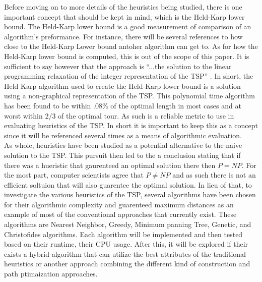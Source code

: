 \documentclass[midd]{thesis}
\newcommand{\tab}{\hspace*{2em}}
\begin{document}
\tab Before moving on to more details of the heuristics being studied, there is one important concept that should be kept in mind, which is the Held-Karp lower bound. The Held-Karp lower bound is a good measurement of comparison of an algorithm's preformance. For instance, there will be several references to how close to the Held-Karp Lower bound antoher algorithm can get to. As for how the Held-Karp lower bound is computed, this is out of the scope of this paper. It is sufficient to say however that the approach is ``...the solution to the linear programming relaxation of the integer representation of the TSP'' \cite{htspc}. In short, the Held Karp algorithm used to create the Held-Karp lower bound is a solution using a non-graphical representation of the TSP. This polynomial time algorithm has been found to be within .08\% of  the optimal length in most cases and at worst within $2/3$ of the optimal tour. As such is a reliable metric to use in evaluating heuristics of the TSP. In short it is important to keep this as a concept since it will be referenced several times as a means of algorithmic evaluation.\\
\tab As whole, heuristics have been studied as a potential alternative to the naive solution to the TSP. This pursuit then led to the a conclusion stating that if there was a hueristic that gaurenteed an optimal solution there then $P = NP$. For the most  part, computer scientists agree that $P \neq NP$ and as such there is not an efficient soltuion that will also guarentee the optimal solution. In lieu of that, to investigate the various heuristics of the TSP, several algorithms have been chosen for their algorithmic complexity and guarenteed maximum distances as an example of most of the conventional approaches that currently exist. These algorithms are Nearest Neighbor, Greedy, Minimum panning Tree, Genetic, and Christofides algorithms. Each algorithm will be implemented and then tested based on their runtime, their CPU usage. After this, it will be explored if their exists a hybrid algorithm that can utilize the best attributes of the traditional heuristics or another approach combining the different kind of construction and path ptimaization approaches.\\
\end{document}
